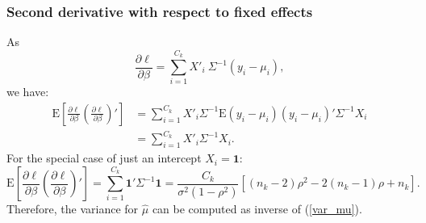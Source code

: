 \documentclass[11pt,a5paper,twoside]{book}
\begin{document}
{\subsubsection{Second derivative with respect to fixed effects}
As $$\frac{\partial \ell}{\partial \beta}=\sum_{i=1}^{C_k} X'_i\ \Sigma^{-1} (y_i-\mu_i),$$
we have:
\begin{equation*}
\begin{aligned}
\mathrm{E}\left[\frac{\partial \ell}{\partial \beta} \left( \frac{\partial \ell}{\partial \beta}\right)' \right] & = \sum_{i=1}^{C_k} X'_i \Sigma^{-1} \mathrm{E}(y_i-\mu_i)(y_i-\mu_i)' \Sigma^{-1}X_i \\
&= \sum_{i=1}^{C_k} X'_i \Sigma^{-1} X_i.
\end{aligned}
\end{equation*}
For the special case of just an intercept $X_i=\mathbf{1}$:
\begin{equation}
\label{var_mu}
\mathrm{E}\left[\frac{\partial \ell}{\partial \beta} \left( \frac{\partial \ell}{\partial \beta}\right)' \right]= \sum_{i=1}^{C_k} \mathbf{1}' \Sigma^{-1} \mathbf{1}= \frac{C_k}{\sigma^2 (1-\rho^2)}\left[(n_k-2)\rho^2 - 2(n_k-1)\rho +n_k \right].
\end{equation}
Therefore, the variance for $\widehat{\mu}$ can be computed as inverse of (\ref{var_mu}).
}
\end{document}
